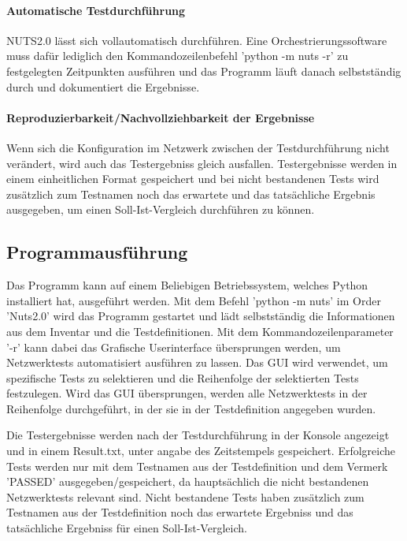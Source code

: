 \documentclass[]{subfiles}
\begin{document}
\paragraph{Automatische Testdurchführung} 
NUTS2.0 lässt sich vollautomatisch durchführen.
Eine Orchestrierungssoftware muss dafür lediglich den Kommandozeilenbefehl
'python -m nuts -r' zu festgelegten Zeitpunkten ausführen und das 
Programm läuft danach selbstständig durch und dokumentiert die Ergebnisse.

\paragraph{Reproduzierbarkeit/Nachvollziehbarkeit der Ergebnisse} 
Wenn sich die Konfiguration im Netzwerk zwischen der Testdurchführung nicht verändert,
wird auch das Testergebniss gleich ausfallen. 
Testergebnisse werden in einem einheitlichen Format gespeichert und bei nicht bestandenen
Tests wird zusätzlich zum Testnamen noch das erwartete und das tatsächliche Ergebnis
ausgegeben, um einen Soll-Ist-Vergleich durchführen zu können.

\subsection{Programmausführung}
Das Programm kann auf einem Beliebigen Betriebssystem, welches Python installiert hat,
ausgeführt werden.
Mit dem Befehl 'python -m nuts' im Order 'Nuts2.0' wird das Programm gestartet und
lädt selbstständig die Informationen aus dem Inventar und die Testdefinitionen.
Mit dem Kommandozeilenparameter '-r' kann dabei das Grafische Userinterface übersprungen
werden, um Netzwerktests automatisiert ausführen zu lassen.
Das GUI wird verwendet, um spezifische Tests zu selektieren und die Reihenfolge der 
selektierten Tests festzulegen.
Wird das GUI übersprungen, werden alle Netzwerktests in der Reihenfolge durchgeführt,
in der sie in der Testdefinition angegeben wurden.

Die Testergebnisse werden nach der Testdurchführung in der Konsole angezeigt und 
in einem Result.txt, unter angabe des Zeitstempels gespeichert. 
Erfolgreiche Tests werden nur mit dem Testnamen aus der Testdefinition und dem Vermerk
'PASSED' ausgegeben/gespeichert, da hauptsächlich die nicht bestandenen Netzwerktests 
relevant sind.
Nicht bestandene Tests haben zusätzlich zum Testnamen aus der Testdefinition noch das
erwartete Ergebniss und das tatsächliche Ergebniss für einen Soll-Ist-Vergleich.

\newpage
\end{document}
